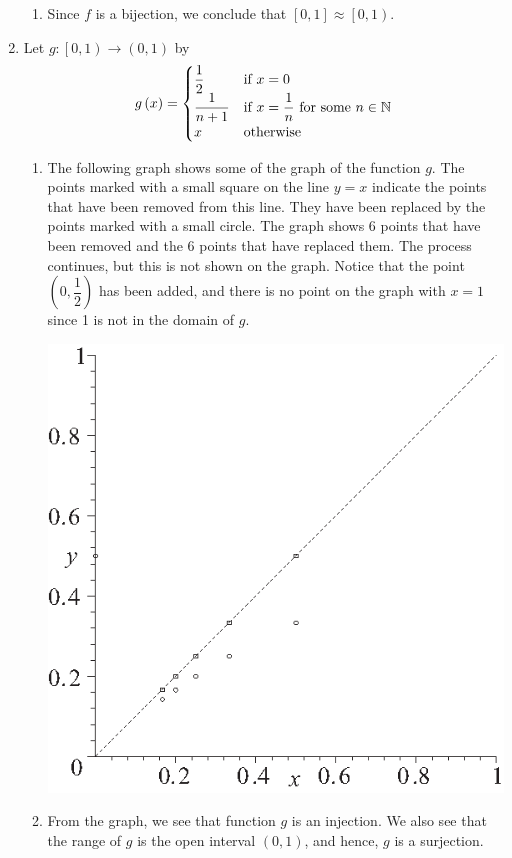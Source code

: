 \documentclass[11pt]{article}
\begin{document}
\begin{enumerate}
\begin{enumerate}
\item Since $f$ is a bijection, we conclude that $\left[0, 1 \right] \approx \left[ 0, 1 \right)$.
\end{enumerate}

\newpage
\item Let $g: \left[ 0, 1 \right) \to \left( 0, 1 \right)$ by
\begin{equation} \notag
g \left( x \right) = 
\begin{cases}
\dfrac{1}{2}           &\text{if $x=0$} \\
\dfrac{1}{n+1}         &\text{if $x=\dfrac{1}{n}$ for some $n \in \mathbb{N}$} \\
x        &\text{otherwise}
\end{cases}
\end{equation}
%
\begin{enumerate}
\item The following graph shows some of the graph of the function $g$.  The points marked with a small square on the line $y = x$ indicate the points that have been removed from this line.  They have been replaced by the points marked with a small circle.  The graph shows 6 points that have been removed and the 6 points that have replaced them.  The process continues, but this is not shown on the graph.  Notice that the point $\left( 0, \dfrac{1}{2} \right)$ has been added, and there is no point on the graph with $x = 1$ since 1 is not in the domain of $g$.

\begin{center}
\includegraphics{figps-sec93-2.eps}
\end{center}
%
\item From the graph, we see that function $g$ is an injection.  We also see that the range of 
$g$ is the open interval $\left( 0, 1 \right)$, and hence, $g$ is a surjection.  


\end{enumerate}
\end{enumerate}
\end{document}

